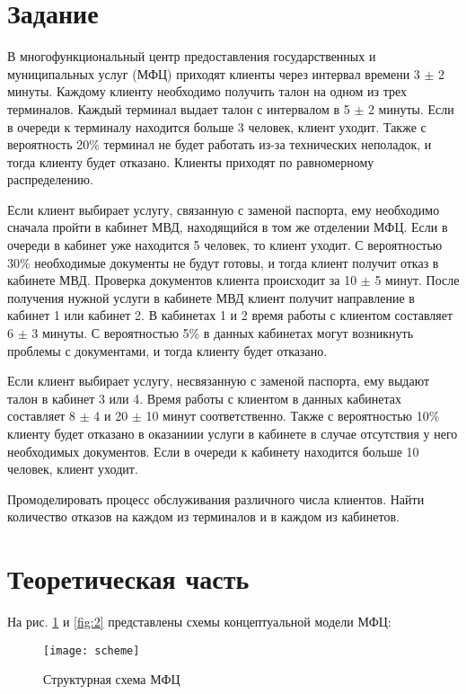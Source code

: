\documentclass[a4paper,fontsize=12bp]{extreport}
\begin{document}
\section*{Задание}

В многофункциональный центр предоставления государственных и муниципальных услуг (МФЦ) приходят клиенты через интервал времени 3 $\pm$ 2 минуты. Каждому клиенту необходимо получить талон на одном из трех терминалов. Каждый терминал выдает талон с интервалом в 5 $\pm$ 2 минуты. Если в очереди к терминалу находится больше 3 человек, клиент уходит. Также с вероятность 20\%  терминал не будет работать из-за технических неполадок, и тогда клиенту будет отказано. Клиенты приходят по равномерному распределению. 

Если клиент выбирает услугу, связанную с заменой паспорта, ему необходимо сначала пройти в кабинет МВД, находящийся в том же отделении МФЦ. Если в очереди в кабинет уже находится 5 человек, то клиент уходит. С вероятностью 30\%  необходимые документы не будут готовы, и тогда клиент получит отказ в кабинете МВД. Проверка документов  клиента происходит за 10 $\pm$ 5 минут. После получения нужной услуги в кабинете МВД клиент получит направление в кабинет 1 или кабинет 2. В кабинетах 1 и 2 время работы с клиентом составляет 6 $\pm$ 3 минуты. С вероятностью 5\% в данных кабинетах могут возникнуть проблемы с документами, и тогда клиенту будет отказано. 

Если клиент выбирает услугу, несвязанную с заменой паспорта, ему выдают талон в кабинет 3 или 4. Время работы с клиентом в данных кабинетах составляет 8 $\pm$ 4 и 20 $\pm$ 10 минут соответственно. Также с вероятностью 10\% клиенту будет отказано в оказаниии услуги в кабинете в случае отсутствия у него необходимых документов. Если в очереди к кабинету  находится больше 10 человек, клиент уходит. 
 
Промоделировать процесс обслуживания различного числа клиентов. Найти количество отказов на каждом из терминалов и в каждом из кабинетов.
	
\section*{Теоретическая часть}
	
На рис. \ref{fig:1} и \ref{fig:2} представлены схемы концептуальной модели МФЦ:


\begin{figure}[H]
    \texttt{[image: scheme]}
    \caption{Структурная схема МФЦ}
    \label{fig:1}
\end{figure}
\end{document}
